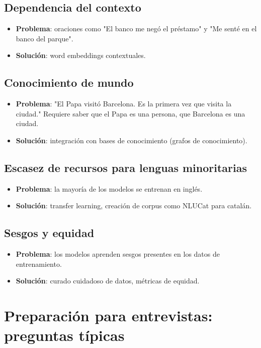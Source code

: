 \documentclass[12pt,a4paper,openany,oneside]{book}
\begin{document}
\subsection{Dependencia del contexto}
\begin{itemize}
    \item \textbf{Problema}: oraciones como "El banco me negó el préstamo" y "Me senté en el banco del parque".
    \item \textbf{Solución}: word embeddings contextuales.
\end{itemize}

\subsection{Conocimiento de mundo}
\begin{itemize}
    \item \textbf{Problema}: "El Papa visitó Barcelona. Es la primera vez que visita la ciudad." Requiere saber que el Papa es una persona, que Barcelona es una ciudad.
    \item \textbf{Solución}: integración con bases de conocimiento (grafos de conocimiento).
\end{itemize}

\subsection{Escasez de recursos para lenguas minoritarias}
\begin{itemize}
    \item \textbf{Problema}: la mayoría de los modelos se entrenan en inglés.
    \item \textbf{Solución}: transfer learning, creación de corpus como NLUCat para catalán.
\end{itemize}

\subsection{Sesgos y equidad}
\begin{itemize}
    \item \textbf{Problema}: los modelos aprenden sesgos presentes en los datos de entrenamiento.
    \item \textbf{Solución}: curado cuidadoso de datos, métricas de equidad.
\end{itemize}

\section{Preparación para entrevistas: preguntas típicas}
\end{document}
